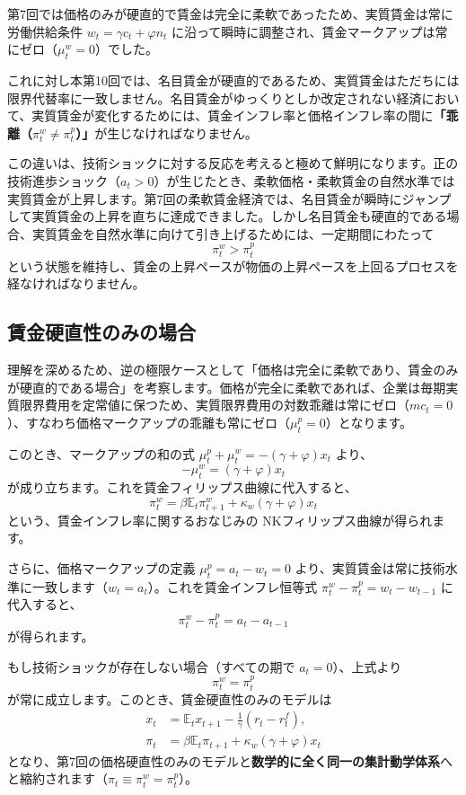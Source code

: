 \documentclass[
  japanese,
  lualatex,
  ja=standard,
  12pt,
  a4paper]{ltjsarticle}
\begin{document}
第7回では価格のみが硬直的で賃金は完全に柔軟であったため、実質賃金は常に労働供給条件
\(w_t = \gamma c_t + \varphi n_t\)
に沿って瞬時に調整され、賃金マークアップは常にゼロ（\(\mu_t^w=0\)）でした。

これに対し本第10回では、名目賃金が硬直的であるため、実質賃金はただちには限界代替率に一致しません。名目賃金がゆっくりとしか改定されない経済において、実質賃金が変化するためには、賃金インフレ率と価格インフレ率の間に\textbf{「乖離（\(\pi_t^w \neq \pi_t^p\)）」}が生じなければなりません。

この違いは、技術ショックに対する反応を考えると極めて鮮明になります。正の技術進歩ショック（\(a_t>0\)）が生じたとき、柔軟価格・柔軟賃金の自然水準では実質賃金が上昇します。第7回の柔軟賃金経済では、名目賃金が瞬時にジャンプして実質賃金の上昇を直ちに達成できました。しかし名目賃金も硬直的である場合、実質賃金を自然水準に向けて引き上げるためには、一定期間にわたって
\[
\pi_t^w > \pi_t^p
\]
という状態を維持し、賃金の上昇ペースが物価の上昇ペースを上回るプロセスを経なければなりません。

\subsection{賃金硬直性のみの場合}\label{ux8cc3ux91d1ux786cux76f4ux6027ux306eux307fux306eux5834ux5408}

理解を深めるため、逆の極限ケースとして「価格は完全に柔軟であり、賃金のみが硬直的である場合」を考察します。価格が完全に柔軟であれば、企業は毎期実質限界費用を定常値に保つため、実質限界費用の対数乖離は常にゼロ（\(mc_t=0\)）、すなわち価格マークアップの乖離も常にゼロ（\(\mu_t^p=0\)）となります。

このとき、マークアップの和の式
\(\mu_t^p + \mu_t^w = -(\gamma+\varphi)x_t\) より、 \[
-\mu_t^w = (\gamma+\varphi)x_t
\] が成り立ちます。これを賃金フィリップス曲線に代入すると、 \[
\pi_t^w
=
\beta\mathbb{E}_t\pi_{t+1}^w
+
\kappa_w(\gamma+\varphi)x_t
\] という、賃金インフレ率に関するおなじみの
NKフィリップス曲線が得られます。

さらに、価格マークアップの定義 \(\mu_t^p = a_t - w_t = 0\)
より、実質賃金は常に技術水準に一致します（\(w_t = a_t\)）。これを賃金インフレ恒等式
\(\pi_t^w - \pi_t^p = w_t - w_{t-1}\) に代入すると、 \[
\pi_t^w - \pi_t^p = a_t - a_{t-1}
\] が得られます。

もし技術ショックが存在しない場合（すべての期で \(a_t=0\)）、上式より \[
\pi_t^w = \pi_t^p
\] が常に成立します。このとき、賃金硬直性のみのモデルは \[
\begin{aligned}
x_t
&=
\mathbb{E}_t x_{t+1}
-
\frac{1}{\gamma}(r_t-r_t^f),
\\
\pi_t
&=
\beta\mathbb{E}_t\pi_{t+1}
+
\kappa_w(\gamma+\varphi)x_t
\end{aligned}
\]
となり、第7回の価格硬直性のみのモデルと\textbf{数学的に全く同一の集計動学体系}へと縮約されます（\(\pi_t \equiv \pi_t^w = \pi_t^p\)）。
\end{document}
